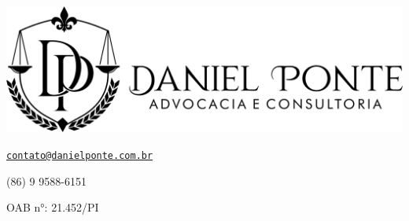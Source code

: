 
     {
    \includegraphics[scale=0.4]{branco.png}
    }
     {}
     {{\href{mailto:contato@danielponte.com.br}{\texttt{contato@danielponte.com.br}}}

     (86) 9 9588-6151

     OAB n°: 21.452/PI
     }
     {} %
     {\thepage}
     {}
     {}
     {\thepage}
     {}


